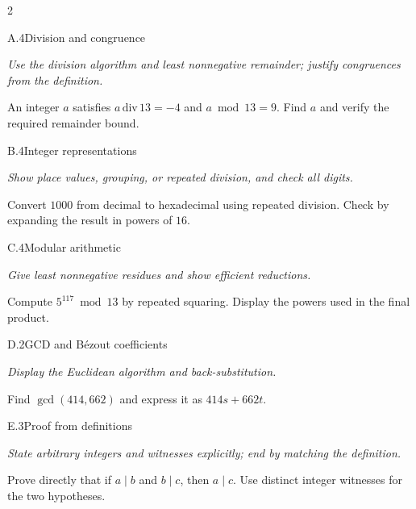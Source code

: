 \documentclass[9pt]{extarticle}
\begin{document}
\begin{multicols}{2}
\begin{CoreProblem}{A.4}{Division and congruence}
{\scriptsize\textit{Use the division algorithm and least nonnegative remainder; justify congruences from the definition.}\par}
An integer $a$ satisfies $a\,\mathrm{div}\,13=-4$ and $a\bmod13=9$.
Find $a$ and verify the required remainder bound.
\end{CoreProblem}
\begin{CoreProblem}{B.4}{Integer representations}
{\scriptsize\textit{Show place values, grouping, or repeated division, and check all digits.}\par}
Convert $1000$ from decimal to hexadecimal using repeated division. Check by
expanding the result in powers of $16$.
\end{CoreProblem}
\begin{CoreProblem}{C.4}{Modular arithmetic}
{\scriptsize\textit{Give least nonnegative residues and show efficient reductions.}\par}
Compute $5^{117}\bmod13$ by repeated squaring. Display the powers used in the
final product.
\end{CoreProblem}
\columnbreak
\begin{CoreProblem}{D.2}{GCD and B\'ezout coefficients}
{\scriptsize\textit{Display the Euclidean algorithm and back-substitution.}\par}
Find $\gcd(414,662)$ and express it as $414s+662t$.
\end{CoreProblem}
\begin{CoreProblem}{E.3}{Proof from definitions}
{\scriptsize\textit{State arbitrary integers and witnesses explicitly; end by matching the definition.}\par}
Prove directly that if $a\mid b$ and $b\mid c$, then $a\mid c$. Use distinct
integer witnesses for the two hypotheses.
\end{CoreProblem}
\end{multicols}
\CoreWorkArea
\FormBreak
{}
\end{document}

